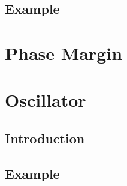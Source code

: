 \documentclass[journal,12pt,twocolumn]{IEEEtran}
\begin{document}
\subsection{Example}

%

\section{Phase Margin}

%

\section{Oscillator}

\subsection{Introduction}

%

\subsection{Example}

%
\end{document}

